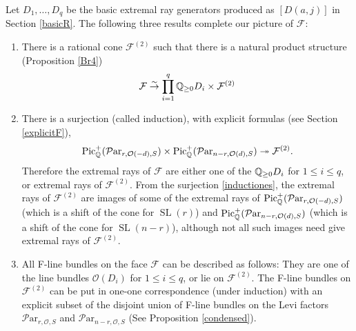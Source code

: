 \documentclass[11pt]{amsart}
\newcommand\mf{\mathcal{F}}
\newcommand\Pic{\operatorname{Pic}}
\newcommand\Par{\mathcal{P}\text{ar} }
\newcommand\SL{\operatorname{SL}}
\newcommand{\leto}[1]{\stackrel{#1}{\to}}
\numberwithin{theorem}{subsection}
\begin{document}
Let $D_1,\dots,D_q$ be the basic extremal ray generators produced as $[D(a,j)]$ in Section \ref{basicR}. The following three results complete our picture of $\mf$:
\begin{enumerate}
\item[(a)]
 There is a rational cone $\mf^{(2)}$ such that
there is a natural product structure (Proposition \ref{Br4})
\begin{equation}\label{productstructure}
\mf\leto{\sim}\prod_{i=1}^q \Bbb{Q}_{\ge 0} D_i \times \mf^{(2)}
\end{equation}
\item[(b)] There is a  surjection (called induction), with explicit formulas (see Section \ref{explicitF}),
\begin{equation}\label{inductiones}
\Pic^+_{\Bbb{Q}}(\Par_{r,\mathcal{O}(-d),S})\times \Pic^+_{\Bbb{Q}}(\Par_{n-r,\mathcal{O}(d),S})\twoheadrightarrow \mf^{(2)}.
\end{equation}
Therefore the extremal rays of $\mf$ are either one of the $\Bbb{Q}_{\ge 0} D_i$ for $1\leq i\leq q$, or extremal rays of $\mf^{(2)}$. From the surjection \eqref{inductiones}, the extremal rays of $\mf^{(2)}$ are images of some of the extremal rays of $\Pic^+_{\Bbb{Q}}(\Par_{r,\mathcal{O}(-d),S})$ (which is a shift of the cone for $\SL(r)$) and $\Pic^+_{\Bbb{Q}}(\Par_{n-r,\mathcal{O}(d),S})$ (which is a shift of the cone for $\SL(n-r)$), although not all such images need give extremal rays of $\mf^{(2)}$.
\item[(c)]
All F-line bundles on the face $\mf$ can be described as follows: They are one of the line bundles $\mathcal{O}(D_i)$ for $1\leq i\leq q$, or lie on $\mf^{(2)}$.  The F-line bundles on $\mf^{(2)}$ can be put in one-one correspondence  (under induction)  with an explicit subset of the disjoint union of F-line bundles on the Levi factors $\Par_{r,\mathcal{O},S}$ and $\Par_{n-r,\mathcal{O},S}$ (See Proposition \ref{condensed}).
\end{enumerate}
\iffalse
\end{document}
